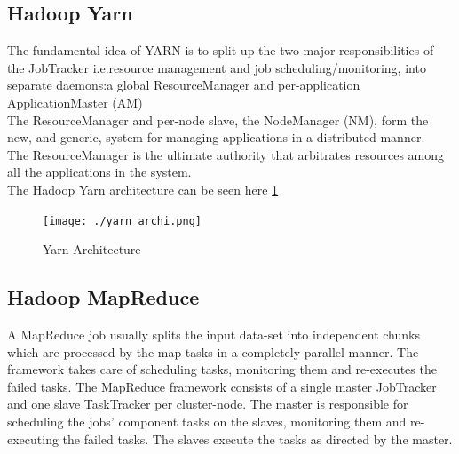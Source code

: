 \documentclass[12pt]{book}
\begin{document}
\subsection{Hadoop Yarn}
The fundamental idea of YARN is to split up the two major responsibilities of the JobTracker 
i.e.resource management and job scheduling/monitoring, into separate daemons:a global ResourceManager and per-application ApplicationMaster (AM)\\
The ResourceManager and per-node slave, the NodeManager (NM), form the new, and generic, system for managing applications in a distributed manner.\\ 
The ResourceManager is the ultimate authority that arbitrates resources among all the applications in the system.\\
The Hadoop Yarn architecture can be seen here \ref{fig:fig1_yarn}
\begin{figure}[ht]
 \centering
 \texttt{[image: ./yarn\_archi.png]}
 \caption{Yarn Architecture\label{fig:fig1_yarn}}
\end{figure}
\subsection{Hadoop MapReduce}
A MapReduce job usually splits the input data-set into independent chunks which are processed by the map tasks in a completely parallel manner.
The framework takes care of scheduling tasks, monitoring them and re-executes the failed tasks.\cite{mapreduce} 
The MapReduce framework consists of a single master JobTracker and one slave TaskTracker per cluster-node. The master is responsible for scheduling the jobs' component tasks on the slaves, monitoring them and re-executing the failed tasks. 
The slaves execute the tasks as directed by the master.
\end{document}
